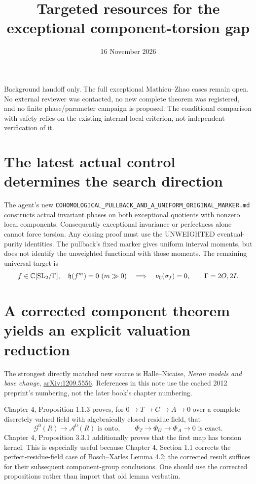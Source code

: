\documentclass{article}
\begin{document}
\title{Targeted resources for the exceptional component-torsion gap}
\date{16 November 2026}
\maketitle
Background handoff only. The full exceptional Mathieu--Zhao cases remain open. No external reviewer was contacted, no new complete theorem was registered, and no finite phase/parameter campaign is proposed. The conditional comparison with safety relies on the existing internal local criterion, not independent verification of it.

\section{The latest actual control determines the search direction}
The agent's new \texttt{COHOMOLOGICAL\_PULLBACK\_AND\_A\_UNIFORM\_ORIGINAL\_MARKER.md} constructs actual invariant phases on both exceptional quotients with nonzero local components. Consequently exceptional invariance or perfectness alone cannot force torsion. Any closing proof must use the UNWEIGHTED eventual-purity identities. The pullback's fixed marker gives uniform interval moments, but does not identify the unweighted functional with those moments. The remaining universal target is
\[
 f\in\mathbb C[\mathrm{SL}_2/\Gamma],\quad \mathfrak h(f^m)=0\ (m\gg0)
 \quad\Longrightarrow\quad \nu_0(\sigma_f)=0,
 \qquad \Gamma=2O,2I.
\]

\section{A corrected component theorem yields an explicit valuation reduction}
The strongest directly matched new source is Halle--Nicaise, \emph{Neron models and base change}, \href{https://arxiv.org/abs/1209.5556}{arXiv:1209.5556}. References in this note use the cached 2012 preprint's numbering, not the later book's chapter numbering.

Chapter 4, Proposition 1.1.3 proves, for $0\to T\to G\to A\to0$ over a complete discretely valued field with algebraically closed residue field, that
\[
 \mathcal G^0(R)\longrightarrow\mathcal A^0(R)
 \text{ is onto},\qquad
 \Phi_T\longrightarrow\Phi_G\longrightarrow\Phi_A\longrightarrow0
 \text{ is exact}.
\]
Chapter 4, Proposition 3.3.1 additionally proves that the first map has torsion kernel. This is especially useful because Chapter 4, Section 1.1 corrects the perfect-residue-field case of Bosch--Xarles Lemma 4.2; the corrected result suffices for their subsequent component-group conclusions. One should use the corrected propositions rather than import that old lemma verbatim.
\end{document}
